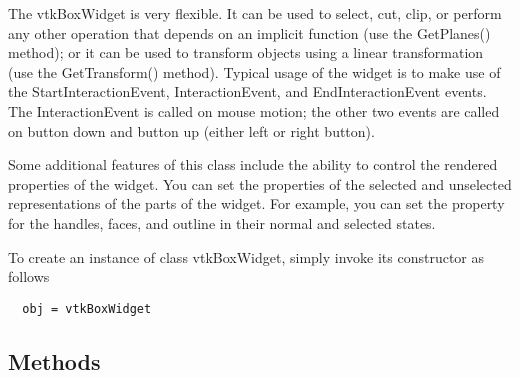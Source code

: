  The vtkBoxWidget is very flexible. It can be used to select, cut, clip, or
 perform any other operation that depends on an implicit function (use the
 GetPlanes() method); or it can be used to transform objects using a linear
 transformation (use the GetTransform() method). Typical usage of the
 widget is to make use of the StartInteractionEvent, InteractionEvent, and
 EndInteractionEvent events. The InteractionEvent is called on mouse
 motion; the other two events are called on button down and button up 
 (either left or right button).

 Some additional features of this class include the ability to control the
 rendered properties of the widget. You can set the properties of the
 selected and unselected representations of the parts of the widget. For
 example, you can set the property for the handles, faces, and outline in
 their normal and selected states.

To create an instance of class vtkBoxWidget, simply
invoke its constructor as follows
\begin{verbatim}
  obj = vtkBoxWidget
\end{verbatim}
\subsection{Methods}


